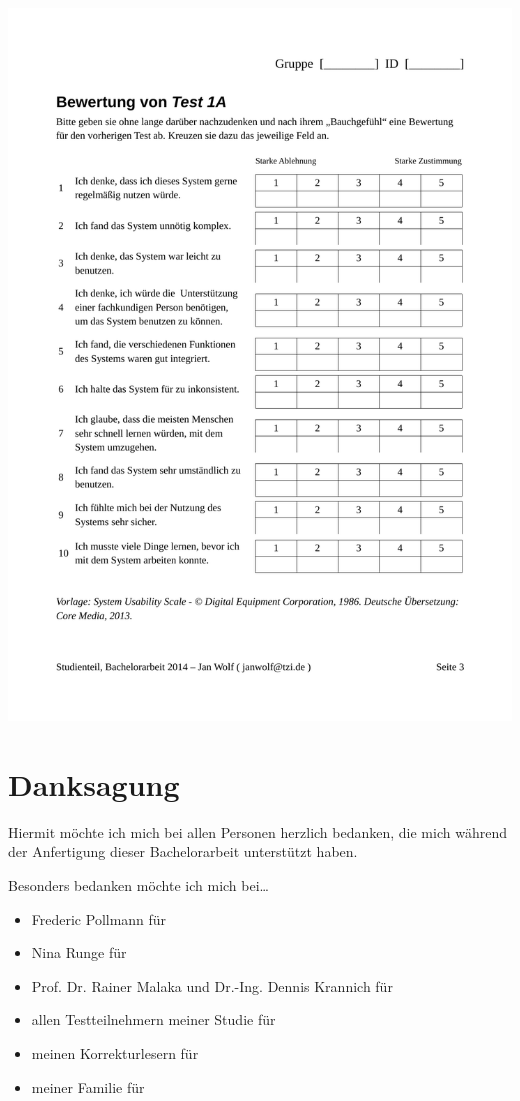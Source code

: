 \documentclass[a4paper,12pt,bibliography=totoc]{scrreprt}%
\begin{document}
\begin{appendix}
\includegraphics[width=\textwidth, page=6]{apx/Bewertungsboegen}
\end{appendix}

\chapter*{Danksagung}
Hiermit möchte ich mich bei allen Personen herzlich bedanken, die mich während der Anfertigung dieser Bachelorarbeit unterstützt haben.

Besonders bedanken möchte ich mich bei\dots
\begin{itemize}
\item Frederic Pollmann für
\item Nina Runge für
\item Prof. Dr. Rainer Malaka und Dr.-Ing. Dennis Krannich für
\item allen Testteilnehmern meiner Studie für
\item meinen Korrekturlesern für
\item meiner Familie für
\end{itemize}
\end{document}
